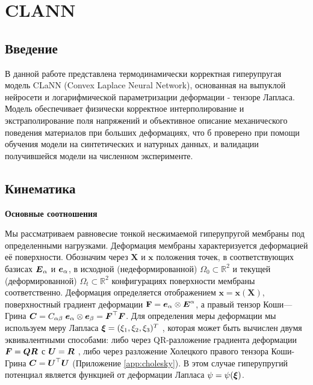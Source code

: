 \chapter{CLANN}

\section{Введение}
В данной работе представлена термодинамически корректная гиперупругая модель CLaNN 
(Convex Laplace Neural Network),
основанная на выпуклой нейросети и логарифмической параметризации деформации - тензоре Лапласа. 
Модель обеспечивает физически корректное интерполирование и экстраполирование поля напряжений и объективное описание механического поведения материалов при больших деформациях,
что б проверено при помощи обучения модели на синтетических и натурных данных, и валидации получившейся модели на численном эксперименте.

\section{Кинематика }
\textbf{Основные соотношения}

Мы рассматриваем равновесие тонкой несжимаемой гиперупругой мембраны под определенными нагрузками.
Деформация мембраны характеризуется деформацией её поверхности. 
Обозначим через \(\mathbf{X}\) и \(\mathbf{x}\) положения точек, 
в соответствующих базисах \(\boldsymbol{E}_{\alpha}\) и \(\boldsymbol{e}_{\alpha}\), 
в исходной (недеформированной) \(\Omega_0 \subset \mathbb{R}^2\) и текущей (деформированной) \(\Omega_t \subset \mathbb{R}^2\)
конфигурациях поверхности мембраны соответственно. 
Деформация определяется отображением \(\mathbf{x} = \mathbf{x}(\mathbf{X})\), 
поверхностный градиент деформации \(\mathbf{F} = \boldsymbol{e}_{\alpha} \otimes \boldsymbol{E}^{\alpha}\),
а правый тензор Коши—Грина \(\boldsymbol{C} = C_{\alpha\beta} \;\boldsymbol{e}_{\alpha} \otimes \boldsymbol{e}_{\beta} = \boldsymbol{F}^{\top} \boldsymbol{F}\). 
Для определения меры деформации мы используем меру Лапласа \(\boldsymbol{\xi} = (\xi_1 , \xi_2 , \xi_3)^T\) \cite{xi2023},
которая может быть вычислен двумя эквивалентными способами: 
либо через QR-разложение градиента деформации \(\boldsymbol{F} = \boldsymbol{Q} \boldsymbol{R}\) с \(\boldsymbol{U} = \boldsymbol{R}\) , 
либо через разложение Холецкого правого тензора Коши-Грина \(\boldsymbol{C} = \boldsymbol{U}^{\top}\boldsymbol{U}\) (Приложение \ref{app:cholesky}).
В этом случае гиперупругий потенциал является функцией от деформации Лапласа \(\psi = \psi(\boldsymbol{\xi})\).


